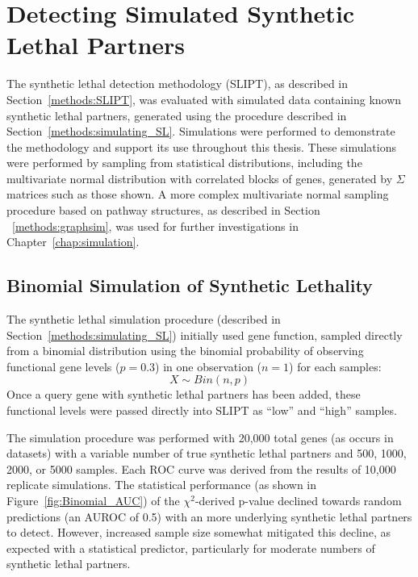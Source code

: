\FloatBarrier

\section{Detecting Simulated Synthetic Lethal Partners} \label{chapt2:simulation_2015}

The \gls{synthetic lethal} detection methodology (\gls{SLIPT}), as described in Section~\ref{methods:SLIPT}, was evaluated with simulated data containing known \gls{synthetic lethal} partners, generated using the procedure described in Section~\ref{methods:simulating_SL}. Simulations were performed to demonstrate the methodology and support its use throughout this thesis. These simulations were performed by sampling from statistical distributions, including the multivariate normal distribution with correlated blocks of genes, generated by $\Sigma$ matrices such as those shown. A more complex multivariate normal sampling procedure based on pathway  structures, as described in Section ~\ref{methods:graphsim}, was used for further investigations in Chapter~\ref{chap:simulation}. 

\subsection{Binomial Simulation of Synthetic Lethality} \label{chapt2:simulation_binom}

The \gls{synthetic lethal} simulation procedure (described in Section~\ref{methods:simulating_SL}) initially used gene function, sampled directly from a binomial distribution using the binomial probability of observing functional gene levels ($p = 0.3$) in one observation ($n = 1$) for each samples: $$X\sim Bin(n,p)$$  Once a query gene with \gls{synthetic lethal} partners has been added, these functional levels were passed directly into \gls{SLIPT} as ``low'' and ``high'' samples.

The simulation procedure was performed with 20,000 total genes (as occurs in  datasets) with a variable number of true \gls{synthetic lethal} partners and 500, 1000, 2000, or 5000 samples. Each \gls{ROC} curve was derived from the results of 10,000 replicate simulations. The statistical performance (as shown in Figure~\ref{fig:Binomial_AUC}) of the $\chi^2$-derived p-value declined towards random predictions (an \gls{AUROC} of 0.5) with an more underlying \gls{synthetic lethal} partners to detect. However, increased sample size somewhat mitigated this decline, as expected with a statistical predictor, particularly for moderate numbers of \gls{synthetic lethal} partners. 

